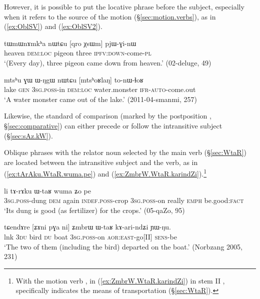 However, it is possible to put the locative phrase before the subject, especially when it refers to the source of the motion (§\ref{sec:motion.verbs}), as in (\ref{ex:OblSV}) and (\ref{ex:OblSV2}).

\begin{exe}
\ex \label{ex:OblSV}
\gll tɯmɯnɤmkʰa nɯtɕu [qro χsɯm] pjɯ-ɣi-nɯ \\
heaven \textsc{dem}:\textsc{loc} pigeon three \textsc{ipfv}:\textsc{down}-come-\textsc{pl} \\
\glt `(Every day), three pigeon came down from heaven.' (02-deluge, 49)
\end{exe}

\begin{exe}
\ex \label{ex:OblSV2}
\gll mtsʰu ɣɯ ɯ-ŋgɯ nɯtɕu [mtsʰoʁlaŋ] to-nɯ-ɬoʁ  \\
lake \textsc{gen} \textsc{3sg}.\textsc{poss}-in \textsc{dem}:\textsc{loc} water.monster \textsc{ifr}-\textsc{auto}-come.out \\
\glt `A water monster came out of the lake.' (2011-04-smanmi, 257)
\end{exe}

Likewise, the standard of comparison (marked by the postposition , §\ref{sec:comparative}) can either precede or follow the intransitive subject (§\ref{sec:sAz.kW}).

Oblique phrases with the relator noun  selected by the main verb (§\ref{sec:WtaR}) are located between the intransitive subject and the verb, as in (\ref{ex:tArAku.WtaR.wuma.pe}) and (\ref{ex:ZmbrW.WtaR.karindZi}).\footnote{
With the motion verb , in (\ref{ex:ZmbrW.WtaR.karindZi}) in stem II ,  specifically indicates the means of transportation (§\ref{sec:WtaR}). }

\begin{exe}
\ex \label{ex:tArAku.WtaR.wuma.pe}
\gll  [ɯ-ɣli nɯ] li tɤ-rɤku ɯ-taʁ wuma ʑo pe \\
\textsc{3sg}.\textsc{poss}-dung \textsc{dem} again \textsc{indef}.\textsc{poss}-crop \textsc{3sg}.\textsc{poss}-on really \textsc{emph} be.good:\textsc{fact} \\
\glt `Its dung is good (as fertilizer) for the crops.' (05-qaZo, 95)
\end{exe}

\begin{exe}
\ex \label{ex:ZmbrW.WtaR.karindZi}
\gll tɕendɤre [ʑɤni pɣa ni] ʑmbrɯ ɯ-taʁ kɤ-ari-ndʑi ɲɯ-ŋu. \\
lnk \textsc{3du} bird \textsc{du} boat \textsc{3sg}.\textsc{poss}-on \textsc{aor}:\textsc{east}-go[II] \textsc{sens}-be \\
\glt `The two of them (including the bird) departed on the boat.' (Norbzang 2005, 231)
\end{exe} 

